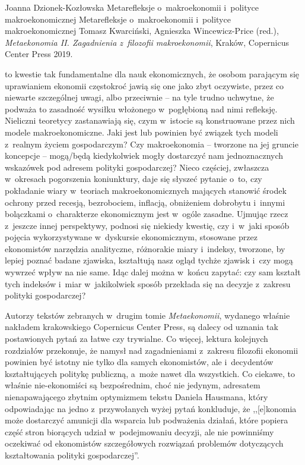 \begin{recplenv}{Joanna Dzionek-Kozłowska}
	{Metarefleksje o~makroekonomii i~polityce makroekonomicznej}
	{Metarefleksje o~makroekonomii i~polityce makroekonomicznej}
	{Tomasz Kwarciński, Agnieszka Wincewicz-Price (red.), \textit{Metaekonomia II. Zagadnienia z~filozofii makroekonomii},
		Kraków, Copernicus Center Press 2019.}





 to kwestie tak fundamentalne dla nauk ekonomicznych, że osobom parającym się uprawianiem ekonomii częstokroć jawią się one jako zbyt oczywiste, przez co niewarte szczególnej uwagi, albo przeciwnie -- na tyle
trudno uchwytne, że podważa to zasadność wysiłku włożonego w~pogłębioną nad nimi refleksję. Nieliczni
teoretycy zastanawiają się, czym w~istocie są konstruowane przez nich modele makroekonomiczne. Jaki jest lub powinien
być związek tych modeli z~realnym życiem gospodarczym? Czy makroekonomia -- tworzone na jej gruncie
koncepcje -- \mbox{mogą/będą} kiedykolwiek
mogły dostarczyć nam jednoznacznych wskazówek pod adresem polityki gospodarczej? Nieco częściej,
zwłaszcza w~okresach pogorszenia koniunktury, daje się słyszeć pytanie o~to, czy pokładanie wiary
w~teoriach makroekonomicznych mających stanowić środek ochrony przed recesją, bezrobociem, inflacją, obniżeniem dobrobytu i~innymi
bolączkami o~charakterze ekonomicznym jest w~ogóle zasadne. Ujmując rzecz z~jeszcze innej perspektywy, podnosi się niekiedy kwestię,
czy i~w~jaki sposób pojęcia wykorzystywane w~dyskursie ekonomicznym, stosowane przez ekonomistów narzędzia analityczne,
różnorakie miary i~indeksy, tworzone, by lepiej poznać badane zjawiska, kształtują nasz ogląd tychże zjawisk i~czy
mogą wywrzeć wpływ na nie same. Idąc dalej można w~końcu zapytać: czy sam kształt tych indeksów i~miar w~jakikolwiek sposób
przekłada się na decyzje z~zakresu polityki gospodarczej? 

Autorzy tekstów zebranych w~drugim tomie \textit{Metaekonomii}, wydanego właśnie nakładem krakowskiego Copernicus Center
Press, są dalecy od uznania tak postawionych pytań za łatwe czy trywialne. Co więcej, lektura kolejnych rozdziałów
przekonuje, że namysł nad zagadnieniami z~zakresu filozofii ekonomii powinien być istotny nie tylko dla samych
ekonomistów, ale i~decydentów kształtujących politykę publiczną, a~może nawet dla wszystkich. Co ciekawe, to
właśnie nie-ekonomiści są bezpośrednim, choć nie jedynym, adresatem nienapawającego zbytnim optymizmem tekstu Daniela Hausmana, który
odpowiadając na jedno z~przywołanych wyżej pytań konkluduje, że ,,[e]konomia może dostarczyć amunicji dla wsparcia lub
podważenia działań, które popiera część stron biorących udział w~podejmowaniu decyzji, ale nie powinniśmy oczekiwać od
ekonomistów szczegółowych rozwiązań problemów dotyczących kształtowania polityki gospodarczej''.


\end{recplenv}

